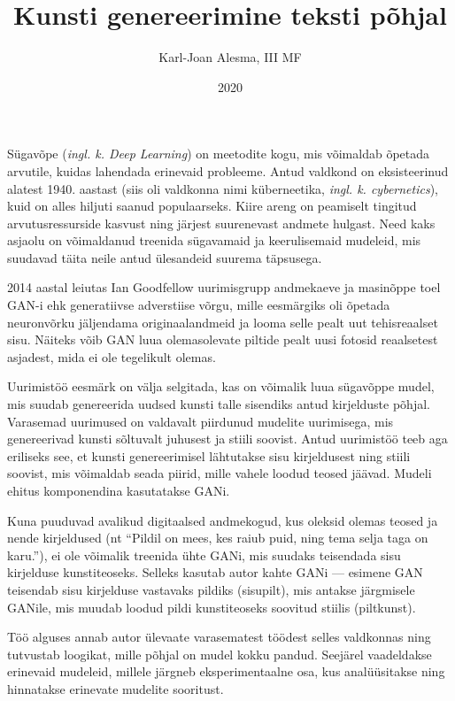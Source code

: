 \documentclass{vilgym}
\title{Kunsti genereerimine teksti põhjal}
\author{Karl-Joan Alesma, III MF}
\date{2020}
\begin{document}
	\maketitle
	\tableofcontents

	\newcommand*{\seefig}[1]{(\hyperref[fig:#1]{vt~joonis~\ref{fig:#1}})}
	\newcommand*{\inglk}[1]{(\textit{ingl. k. #1})}

	Sügavõpe \inglk{Deep Learning} on meetodite kogu, mis võimaldab õpetada arvutile, kuidas lahendada erinevaid probleeme. Antud valdkond on eksisteerinud alatest 1940. aastast (siis oli valdkonna nimi küberneetika, \textit{ingl. k. cybernetics}), kuid on alles hiljuti saanud populaarseks. Kiire areng on peamiselt tingitud arvutusressurside kasvust ning järjest suurenevast andmete hulgast. Need kaks asjaolu on võimaldanud treenida sügavamaid ja keerulisemaid mudeleid, mis suudavad täita neile antud ülesandeid suurema täpsusega. \parencite{deeplearningbook}	 

	2014 aastal leiutas Ian Goodfellow uurimisgrupp andmekaeve ja masinõppe toel GAN-i ehk generatiivse adverstiise võrgu, mille eesmärgiks oli õpetada neuronvõrku jäljendama originaalandmeid ja looma selle pealt uut tehisreaalset sisu. Näiteks võib GAN luua olemasolevate piltide pealt uusi fotosid reaalsetest asjadest, mida ei ole tegelikult olemas. \parencite{gan}

	Uurimistöö eesmärk on välja selgitada, kas on võimalik luua sügavõppe mudel, mis suudab genereerida uudsed kunsti talle sisendiks antud kirjelduste põhjal. Varasemad uurimused on valdavalt piirdunud mudelite uurimisega, mis genereerivad kunsti sõltuvalt juhusest ja stiili soovist. Antud uurimistöö teeb aga eriliseks see, et kunsti genereerimisel lähtutakse sisu kirjeldusest ning stiili soovist, mis võimaldab seada piirid, mille vahele loodud teosed jäävad. Mudeli ehitus komponendina kasutatakse GANi.

	Kuna puuduvad avalikud digitaalsed andmekogud, kus oleksid olemas teosed ja nende kirjeldused (nt \enquote{Pildil on mees, kes raiub puid, ning tema selja taga on karu.}), ei ole võimalik treenida ühte GANi, mis suudaks teisendada sisu kirjelduse kunstiteoseks. Selleks kasutab autor kahte GANi --- esimene GAN teisendab sisu kirjelduse vastavaks pildiks (sisu\textrightarrow pilt), mis antakse järgmisele GANile, mis muudab loodud pildi kunstiteoseks soovitud stiilis (pilt\textrightarrow kunst).

	Töö alguses annab autor ülevaate varasematest töödest selles valdkonnas ning tutvustab loogikat, mille põhjal on mudel kokku pandud. Seejärel vaadeldakse erinevaid mudeleid, millele järgneb eksperimentaalne osa, kus analüüsitakse ning hinnatakse erinevate mudelite sooritust. 
	
\end{document}
